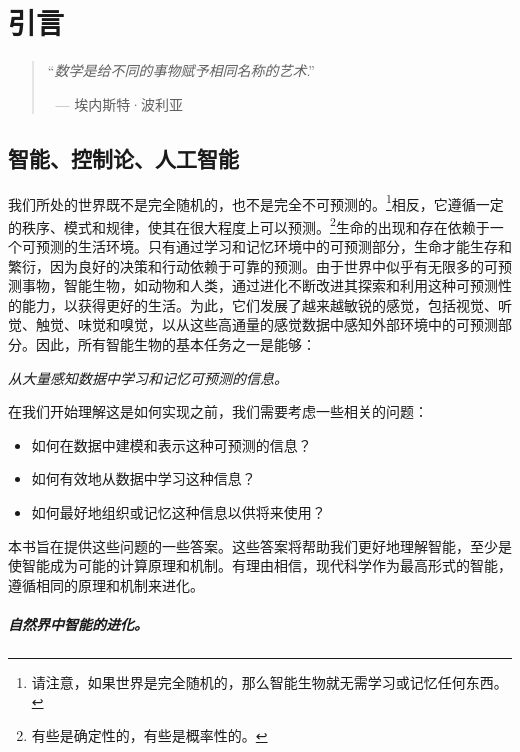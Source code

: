 \documentclass[../../book-main.tex]{subfiles}
\begin{document}
\chapter{引言}
\label{ch:intro}

\begin{quote}
\hfill    ``{\em 数学是给不同的事物赋予相同名称的艺术}.''

$~$ \hfill --- 埃内斯特·波利亚
\end{quote}
\vspace{5mm}

\section{智能、控制论、人工智能}
我们所处的世界既不是完全随机的，也不是完全不可预测的。\footnote{请注意，如果世界是完全随机的，那么智能生物就无需学习或记忆任何东西。}相反，它遵循一定的秩序、模式和规律，使其在很大程度上可以预测。\footnote{有些是确定性的，有些是概率性的。}生命的出现和存在依赖于一个可预测的生活环境。只有通过学习和记忆环境中的可预测部分，生命才能生存和繁衍，因为良好的决策和行动依赖于可靠的预测。由于世界中似乎有无限多的可预测事物，智能生物，如动物和人类，通过进化不断改进其探索和利用这种可预测性的能力，以获得更好的生活。为此，它们发展了越来越敏锐的感觉，包括视觉、听觉、触觉、味觉和嗅觉，以从这些高通量的感觉数据中感知外部环境中的可预测部分。因此，所有智能生物的基本任务之一是能够：
\begin{center}
    {\em 从大量感知数据中学习和记忆可预测的信息。}
\end{center}
在我们开始理解这是如何实现之前，我们需要考虑一些相关的问题：
\begin{itemize}
    \item 如何在数据中建模和表示这种可预测的信息？
    \item 如何有效地从数据中学习这种信息？
    \item 如何最好地组织或记忆这种信息以供将来使用？
\end{itemize}
本书旨在提供这些问题的一些答案。这些答案将帮助我们更好地理解智能，至少是使智能成为可能的计算原理和机制。有理由相信，现代科学作为最高形式的智能，遵循相同的原理和机制来进化。

\paragraph{自然界中智能的进化。}
\end{document}
